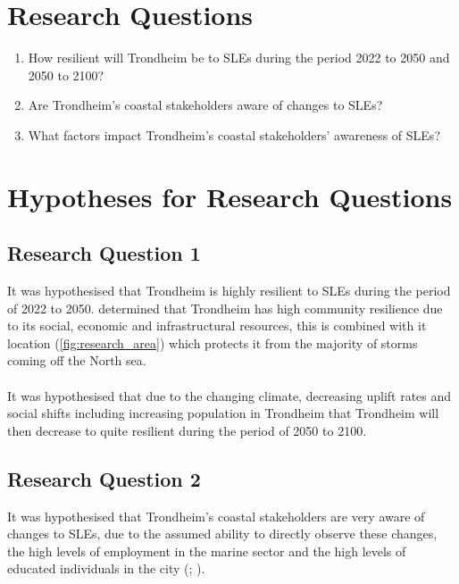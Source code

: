 \section{Research Questions}
\begin{enumerate}
    \item How resilient will Trondheim be to SLEs during the period 2022 to 2050 and 2050 to 2100?
    \item Are Trondheim's coastal stakeholders aware of changes to SLEs?
    \item What factors impact  Trondheim's coastal stakeholders’ awareness of SLEs?
\end{enumerate}


\section{Hypotheses for Research Questions}

\subsection{Research Question 1}
It was hypothesised that Trondheim is highly resilient to SLEs during the period of 2022 to 2050. \cite{opach_seeking_2020} determined that Trondheim has high community resilience due to its social, economic and infrastructural resources, this is combined with it location (\ref{fig:research_area}) which protects it from the majority of storms coming off the North sea.
\paragraph{}
It was hypothesised that due to the changing climate, decreasing uplift rates and social shifts including increasing population in Trondheim that Trondheim will then decrease to quite resilient during the period of 2050 to 2100. 
\paragraph{}

 
\subsection{Research Question 2}
It was hypothesised that Trondheim's coastal stakeholders are very aware of changes to SLEs, due to the assumed ability to directly observe these changes, the high levels of employment in the marine sector and the high levels of educated individuals in the city (\cite{opach_seeking_2020}; \cite{lujala_role_2020}).


